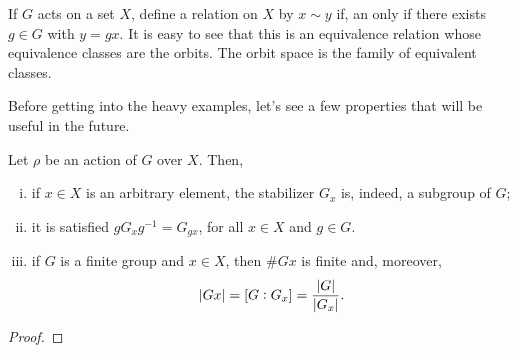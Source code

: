 \documentclass[../main.tex]{subfiles}
\begin{document}
If $G$ acts on a set $X$, define a relation on $X$ by $x\sim y$ if, an only if there exists $g\in G$ with $y = gx$. It is easy to see that this is an equivalence relation whose equivalence classes are the orbits. The orbit space is the family of equivalent classes.

Before getting into the heavy examples, let's see a few properties that will be useful in the future.

\begin{prop}
Let $\rho$ be an action of $G$ over $X$. Then, 
\begin{enumerate}[(i)]
    \item if $x\in X$ is an arbitrary element, the stabilizer $G_x$ is, indeed, a subgroup of $G$;
    \item it is satisfied $gG_xg^{-1} = G_{gx}$, for all $x\in X$ and $g\in G$.
    \item if $G$ is a finite group and $x\in X$, then $\#Gx$ is finite and, moreover,
    \begin{equation}
        \notag
        |Gx| = [G:G_x] = \frac{|G|}{|G_x|}.
    \end{equation}
\end{enumerate}
\end{prop}
\begin{proof}
\noproof
\end{proof}
\end{document}
